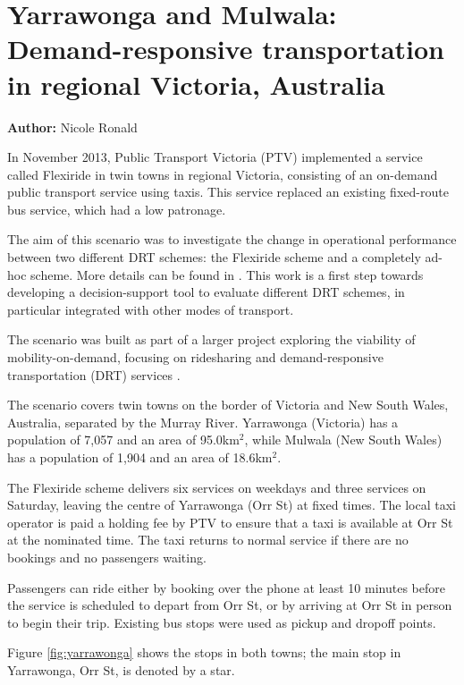 \section{Yarrawonga and Mulwala: Demand-responsive transportation in regional Victoria, Australia}
\label{sec:yarrawonga}
\hfill \textbf{Author:} Nicole Ronald

In November 2013, Public Transport Victoria (PTV) implemented a service called
Flexiride in twin towns in regional Victoria, consisting of an on-demand public
transport service using taxis. This service replaced an existing fixed-route bus
service, which had a low patronage.

The aim of this scenario was to investigate the change in operational
performance between two different DRT schemes: the Flexiride scheme and a
completely ad-hoc scheme. More details can be found in
\citep[][]{RonThoWin2015}. This work is a first step towards developing a
decision-support tool to evaluate different DRT schemes, in particular
integrated with other modes of transport. 


The scenario was built as part of a larger project exploring the viability of
mobility-on-demand, focusing on ridesharing and demand-responsive transportation
(DRT) services \citep[][]{Ronald_iMoD_2014}.

The scenario covers twin towns on the border of Victoria and New South Wales,
Australia, separated by the Murray River. Yarrawonga (Victoria) has a population
of 7,057 and an area of 95.0km$^2$, while Mulwala (New South Wales) has a
population of 1,904 and an area of 18.6km$^2$. 

The Flexiride scheme delivers six services on weekdays and three services on
Saturday, leaving the centre of Yarrawonga (Orr St) at fixed times.  The local
taxi operator is paid a holding fee by PTV to ensure that a taxi is available at
Orr St at the nominated time. The taxi returns to normal service if there are no
bookings and no passengers waiting.

Passengers can ride either by booking over the phone at least 10 minutes before
the service is scheduled to depart from Orr St, or by arriving at Orr St in
person to begin their trip. Existing bus stops were used as pickup and dropoff
points.

Figure \ref{fig:yarrawonga} shows the stops in both towns; the main stop
in Yarrawonga, Orr St, is denoted by a star.

